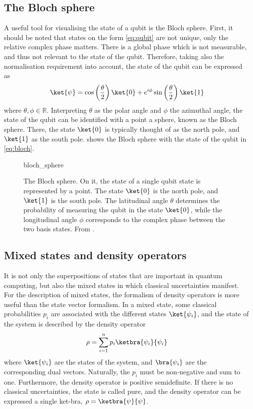 \subsection{The Bloch sphere}
A useful tool for visualising the state of a qubit is the Bloch sphere.
First, it should be noted that states on the form \cref{eq:qubit} are not unique, only the relative complex phase matters.
There is a global phase which is not measurable, and thus not relevant to the state of the qubit.
Therefore, taking also the normalisation requirement into account, the state of the qubit can be expressed as
\begin{equation}
    \ket{\psi} = \cos\left(\frac{\theta}{2}\right) \ket{0} + e^{i\phi} \sin\left(\frac{\theta}{2}\right) \ket{1}
    \label{eq:bloch}
\end{equation}
where $\theta, \phi \in \mathbb{R}$.
Interpreting $\theta$ as the polar angle and $\phi$ the azimuthal angle, the state of the qubit can be identified with a point a sphere, known as the Bloch sphere.
There, the state $\ket{0}$ is typically thought of as the north pole, and $\ket{1}$ as the south pole.
 shows the Bloch sphere with the state of the qubit in \cref{eq:bloch}.

\begin{figure}
    \centering
    \def\svgwidth{0.5\textwidth}
    {bloch_sphere}
    \caption{
        The Bloch sphere.
        On it, the state of a single qubit state is represented by a point.
        The state $\ket{0}$ is the north pole, and $\ket{1}$ is the south pole.
        The latitudinal angle $\theta$ determines the probability of measuring the qubit in the state $\ket{0}$, while the longitudinal angle $\phi$ corresponds to the complex phase between the two basis states.
        From \cite{wikipedia_bloch}.
    }
    \label{fig:bloch}
\end{figure}

\subsection{Mixed states and density operators}
It is not only the superpositions of states that are important in quantum computing, but also the mixed states in which classical uncertainties manifest.
For the description of mixed states, the formalism of density operators is more useful than the state vector formalism.
In a mixed state, some classical probabilities $p_i$ are associated with the different states $\ket{\psi_i}$, and the state of the system is described by the density operator
\begin{equation}
    \rho = \sum_{i=1}^n p_i \ketbra{\psi_i}{\psi_i}
    \label{eq:density}
\end{equation}
where $\ket{\psi_i}$ are the states of the system, and $\bra{\psi_i}$ are the corresponding dual vectors.
Naturally, the $p_i$ must be non-negative and sum to one.
Furthermore, the density operator is positive semidefinite.
If there is no classical uncertainties, the state is called pure, and the density operator can be expressed a single ket-bra, $\rho = \ketbra{\psi}{\psi}$.


